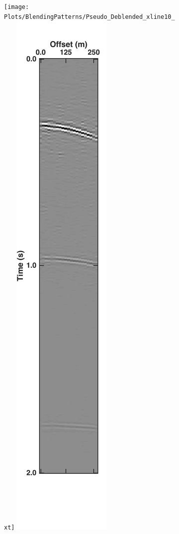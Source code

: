 \begin{figure}
\begin{subfigure}[t]{0.26\textwidth}
		\caption{}
		\label{fig:Ch-Results-Debl-inline10-t}
	\end{subfigure}
	\centering
	\begin{subfigure}[t]{0.26\textwidth}
		\centering
		\texttt{[image: Plots/BlendingPatterns/Pseudo\_Deblended\_xline10\_xt]}
		\includegraphics[height = 0.38\textheight]{Plots/BlendingPatterns/Deblended_xline10xt}
		\caption{}
		\label{fig:Ch-Results-Debl-inline10-xt}
	\end{subfigure}
	

\end{figure}
